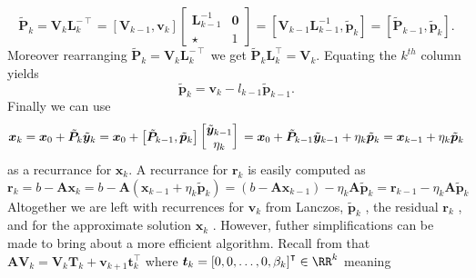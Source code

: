 \[
    \tilde{\bm{P}}_{k} = \bm{V}_{k} \bm{L}_k^{-\intercal} = \left[ \bm{V}_{k-1} , \bm{v}_k \right]
    \begin{bmatrix}
        \bm{L}_{k-1}^{-1} & \bm{0} \\
        \star             & 1
    \end{bmatrix}
    = \left[ \bm{V}_{k-1} \bm{L}_{k-1}^{-1} , \tilde{\bm{p}}_{k} \right]
    = \left[ \tilde{\bm{P}}_{k-1} , \tilde{\bm{p}}_{k} \right].
\]
Moreover rearranging $\tilde{\bm{P}}_{k} = \bm{V}_{k} \bm{L}_k^{-\intercal}$ we get $\tilde{\bm{P}}_{k} \bm{L}_k^{\intercal} = \bm{V}_{k}$. Equating the $k^{th}$ column yields
\begin{equation} \label{eq: pk_rec}
    \tilde{\bm{p}}_{k} = \bm{v}_k - l_{k-1} \tilde{\bm{p}}_{k-1}.
\end{equation}
Finally we can use
\begin{equation} \label{eq: xk_rec}
    \bm{x}_k = \bm{x}_0 + \tilde{\bm{P}}_{k} \tilde{\bm{y}}_{k}                                 \\
    = \bm{x}_0 + \left[ \tilde{\bm{P}}_{k-1} , \tilde{\bm{p}}_{k} \right]
    \begin{bmatrix}
        \tilde{\bm{y}}_{k-1} \\
        \eta_k
    \end{bmatrix}                                                                    \\
    = \bm{x}_0 + \tilde{\bm{P}}_{k-1} \tilde{\bm{y}}_{k-1} + \eta_k \tilde{\bm{p}}_{k} \\
    = \bm{x}_{k-1} + \eta_k \tilde{\bm{p}}_{k}
\end{equation}
as a recurrance for $\bm{x}_k$. A recurrance for $\bm{r}_k$ is easily computed as
\begin{equation} \label{eq: rk_rec}
    \bm{r}_{k} = b - \bm{A} \bm{x}_k = b - \bm{A} \left( \bm{x}_{k-1} + \eta_k \tilde{\bm{p}}_{k} \right) = \left( b - \bm{A} \bm{x}_{k-1} \right) - \eta_k \bm{A} \tilde{\bm{p}}_{k} = \bm{r}_{k-1} - \eta_k \bm{A} \tilde{\bm{p}}_{k}
\end{equation}
Altogether we are left with recurrences for $\bm{v}_k$ from Lanczos, $\tilde{\bm{p}}_{k}$ , the residual $\bm{r}_k$ ,  and for the approximate solution $\bm{x}_k$ . However, futher simplifications can be made to bring about a more efficient algorithm. Recall from  that $\bm{A} \bm{V}_{k} =  \bm{V}_{k} \bm{T}_k + \bm{v}_{k+1} \bm{t}_{k}^{\intercal}$ where $\bm{t}_k = \left[ 0,0, \ldots , 0, \beta_k \right]^{\intercal} \in \RR^k$ meaning
